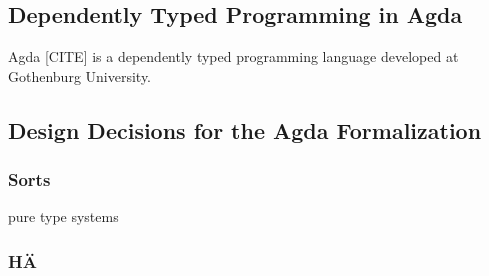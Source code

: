 \subsection{Dependently Typed Programming in Agda}
Agda [CITE] is a dependently typed programming language developed at Gothenburg University. 
\subsection{Design Decisions for the Agda Formalization}
\subsubsection{Sorts}
pure type systems
\subsubsection{HÄ}
